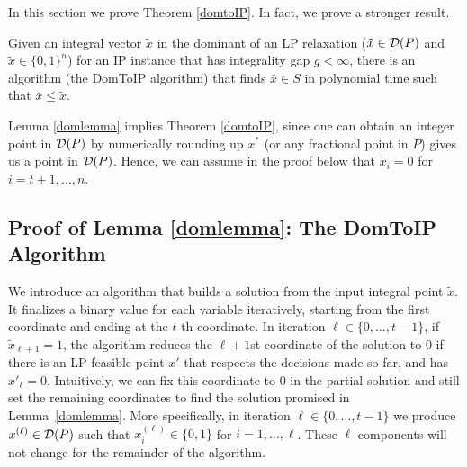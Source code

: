 In this section we prove Theorem \ref{domtoIP}. In fact, we prove a stronger result. 
\begin{lemma}\label{domlemma}
	Given an integral vector $\tilde{x}$ in the dominant of an LP relaxation ($\tilde{x}\in \operatorname{\mathcal{D}}(P)$ and $\tilde{x}\in \{0,1\}^n$) for an IP instance that has integrality gap $g < \infty$, there is an algorithm (the DomToIP algorithm) that finds $\bar{x}\in S$ in polynomial time such that $\bar{x}\leq \tilde{x}$.\end{lemma}
Lemma \ref{domlemma} implies Theorem \ref{domtoIP}, since one can obtain an integer point in $\operatorname{\mathcal{D}}(P)$ by numerically rounding up $x^*$ (or any fractional point in $P$) gives us a point in $\operatorname{\mathcal{D}}(P)$.
Hence, we can assume in the proof below that $\tilde{x}_i= 0$ for $i=t+1,\ldots,n$. 
\subsection{Proof of Lemma \ref{domlemma}: The DomToIP Algorithm}

We introduce an algorithm that builds a solution from the input integral point $\tilde{x}$. It finalizes a binary value for each variable iteratively, starting from the first coordinate and ending at the $t$-th coordinate.
In iteration $\ell\in \{0,\ldots,t-1\}$, if $\tilde{x}_{\ell+1}=1$, the algorithm reduces the $\ell + 1$st coordinate of the solution to $0$ if there is an LP-feasible point $x'$ that respects the decisions made so far, and has $x'_{\ell}=0$. Intuitively, we can fix this coordinate to $0$ in the partial solution and still set the remaining coordinates to find the solution promised in Lemma~\ref{domlemma}. More specifically, in iteration $\ell\in \{0,\ldots,t-1\}$ we produce $x^{(\ell)}\in \operatorname{\mathcal{D}}(P)$ such that $x^{(\ell)}_i\in \{0,1\}$ for $i=1,\ldots,\ell$. These $\ell$ components will not change for the remainder of the algorithm.

